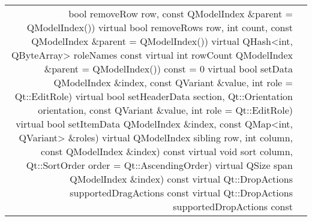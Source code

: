 \begin{tabular}{|r|l|}
bool	removeRow row, const QModelIndex \&parent = QModelIndex())
virtual bool	removeRows row, int count, const QModelIndex \&parent = QModelIndex())
virtual QHash<int, QByteArray>	roleNames const
virtual int	rowCount QModelIndex \&parent = QModelIndex()) const = 0
virtual bool	setData QModelIndex \&index, const QVariant \&value, int role = Qt::EditRole)
virtual bool	setHeaderData section, Qt::Orientation orientation, const QVariant \&value, int role = Qt::EditRole)
virtual bool	setItemData QModelIndex \&index, const QMap<int, QVariant> \&roles)
virtual QModelIndex	sibling row, int column, const QModelIndex \&index) const
virtual void	sort column, Qt::SortOrder order = Qt::AscendingOrder)
virtual QSize	span QModelIndex \&index) const
virtual Qt::DropActions	supportedDragActions const
virtual Qt::DropActions	supportedDropActions const

\hline
\end{tabular}

